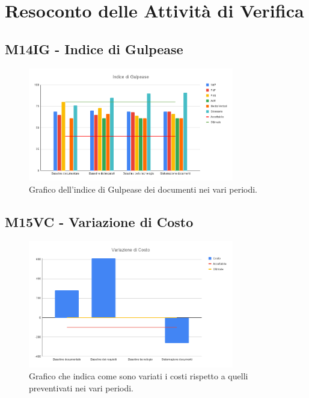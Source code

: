 \section{Resoconto delle Attività di Verifica}
\subsection{M14IG - Indice di Gulpease}
\begin{figure}[H]
    \centering\includegraphics[width=0.8\textwidth, height=0.8\textheight,keepaspectratio]{images/Indice-di-Gulpease.png}
    \caption{Grafico dell'indice di Gulpease dei documenti nei vari periodi.}
\end{figure}    


\subsection{M15VC - Variazione di Costo}
\begin{figure}[H]
    \centering\includegraphics[width=0.8\textwidth, height=0.8\textheight,keepaspectratio]{images/Variazione-di-Costo.png}
    \caption{Grafico che indica come sono variati i costi rispetto a quelli preventivati nei vari periodi.}
\end{figure}    

